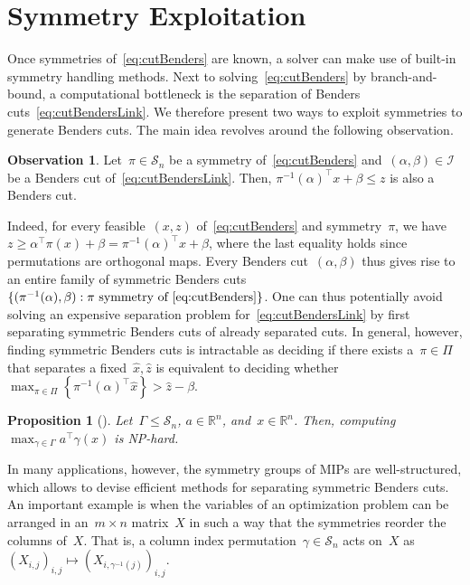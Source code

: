 \documentclass[a4paper,10pt]{article}
\newcommand{\R}{\mathds{R}}
\newcommand{\fixed}[1]{\hat{ #1 }}
\newcommand{\sym}[1]{\mathcal{S}_{#1}}
\newcommand{\sprod}[2]{#1^\top #2}
\newcommand{\brackets}[1]{\left\{ #1 \right\}}
\newtheorem{proposition}[theorem]{Proposition}
\theoremstyle{definition}
\newtheorem{observation}[theorem]{Observation}
\begin{document}
%
%

\section{Symmetry Exploitation}
\label{sec:usingsymmetry}
Once symmetries of~\eqref{eq:cutBenders} are known, a solver can make use of built-in symmetry handling methods.
Next to solving~\eqref{eq:cutBenders} by branch-and-bound, a computational bottleneck is the separation of Benders cuts~\eqref{eq:cutBendersLink}.
We therefore present two ways to exploit symmetries to generate Benders cuts.
The main idea revolves around the following observation.
%
\begin{observation}
  \label{obs:sym-cut}
  Let~$\pi \in \sym{n}$ be a symmetry of~\eqref{eq:cutBenders} and~$(\alpha,\beta) \in \mathcal{I}$ be a Benders cut of~\eqref{eq:cutBendersLink}.
  Then, $\sprod{\pi^{-1}(\alpha)}{x} + \beta \leq z$ is also a Benders cut.
\end{observation}
%
Indeed, for every feasible~$(x,z)$ of~\eqref{eq:cutBenders} and symmetry~$\pi$, we have~$z \geq \sprod{\alpha}{\pi(x)} + \beta = \sprod{\pi^{-1}(\alpha)}{x} + \beta$, where the last equality holds since permutations are orthogonal maps.
Every Benders cut~$(\alpha,\beta)$ thus gives rise to an entire family of symmetric Benders cuts~$\{(\pi^{-1}(\alpha),\beta) : \pi \text{ symmetry of~\eqref{eq:cutBenders}}\}$.
One can thus potentially avoid solving an expensive separation problem for~\eqref{eq:cutBendersLink} by first separating symmetric Benders cuts of already separated cuts.
In general, however, finding symmetric Benders cuts is intractable as deciding if there exists a~$\pi\in\Pi$ that separates a fixed~$\fixed{x},\fixed{z}$ is equivalent to deciding whether $\max_{\pi\in\Pi}\brackets{\sprod{\pi^{-1}(\alpha)}{\fixed{x}}} > \fixed{z} -\beta$.
%
\begin{proposition}[\cite{buchheim2005linear}]
  Let~$\Gamma \leq \sym{n}$, $a \in \R^{n}$, and~$x \in \R^n$.
  Then, computing~$\max_{\gamma \in \Gamma} \sprod{a}{\gamma(x)}$ is NP-hard.
\end{proposition}
%
In many applications, however, the symmetry groups of MIPs are well-structured, which allows to devise efficient methods for separating symmetric Benders cuts.
An important example is when the variables of an optimization problem can be arranged in an~$m \times n$ matrix~$X$ in such a way that the symmetries reorder the columns of~$X$.
That is, a column index permutation~$\gamma \in \sym{n}$ acts on~$X$ as~$(X_{i,j})_{i,j} \mapsto (X_{i,\gamma^{-1}(j)})_{i,j}$.
\end{document}
